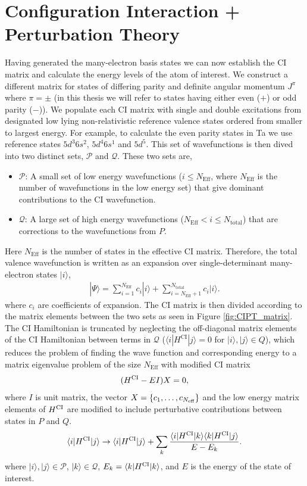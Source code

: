 \documentclass[8pt,a4paper, twoside]{report}
\begin{document}
\section{Configuration Interaction + Perturbation Theory}
Having generated the many-electron basis states we can now establish the CI matrix and calculate the energy levels of the atom of interest. We construct a different matrix for states of differing parity and definite angular momentum $J^{\pi}$ where $\pi = \pm$ (in this thesis we will refer to states having either even ($+$) or odd parity ($-$)). We populate each CI matrix with single and double excitations from designated low lying non-relativistic reference valence states ordered from smaller to largest energy. For example, to calculate the even parity states in Ta we use reference states $5d^3 6s^2$, $5d^4 6s^1$ and $5d^5$. This set of wavefunctions is then dived into two distinct sets, $\mathcal{P}$ and $\mathcal{Q}$. These two sets are,
\begin{itemize}
\item $\mathcal{P}$: A small set of low energy wavefunctions ($i \leq N_{\text{Eff}}$, where $N_{\text{Eff}}$ is the number of wavefunctions in the low energy set) that give dominant contributions to the CI wavefunction.
\item $\mathcal{Q}$: A large set of high energy wavefunctions ($N_{\text{Eff}}<i \leq N_{\text{total}}$) that are corrections to the wavefunctions from $P$.
\end{itemize}
Here $N_{\text{Eff}}$ is the number of states in the effective CI matrix. Therefore, the total valence wavefunction is written as an expansion over single-determinant many-electron states $|i \rangle $,
\begin{align*}\label{eq:psi}
| \Psi \rangle = 
\sum_{i=1}^{N_{\text{Eff}}} c_{i}|i\rangle + \sum_{i = N_{\text{Eff}} + 1}^{N_{\text{total}}} c_{i}|i\rangle .
\end{align*}
where $c_i$ are coefficients of expansion. The CI matrix is then divided according to the matrix elements between the two sets as seen in Figure \ref{fig:CIPT_matrix}.  The CI Hamiltonian is truncated by neglecting the off-diagonal matrix elements of the CI Hamiltonian between terms in $\mathcal{Q}$ ($\langle i | H^{\text{CI}} | j \rangle = 0 $ for $|i\rangle, |j\rangle \in Q$),  which reduces the problem of finding the wave function and corresponding energy to a matrix eigenvalue problem of the size $N_{\text{Eff}}$ with modified CI matrix
\begin{equation} \label{eq:CI}
(H^{\rm CI} - EI)X=0,
\end{equation}
where $I$ is unit matrix, the vector $X = \{c_1, \dots, c_{N_{\rm eff}}\}$ and the low energy matrix elements of $H^{\rm CI}$ are modified to include perturbative contributions between states in $P$ and $Q$.
\begin{equation}
\langle i|H^{\rm CI}|j\rangle \rightarrow \langle i|H^{\rm CI}|j\rangle + 
\sum_k \frac{\langle i|H^{\rm CI}|k\rangle\langle k|H^{\rm
    CI}|j\rangle}{E - E_k}. 
    \label{eq:HCI}
\end{equation}
where $|i\rangle, |j\rangle \in \mathcal{P}$, $|k\rangle \in \mathcal{Q}$,  $E_k = \langle k|H^{\rm CI}|k\rangle$, and $E$ is the energy of the state of interest.  
\end{document}
